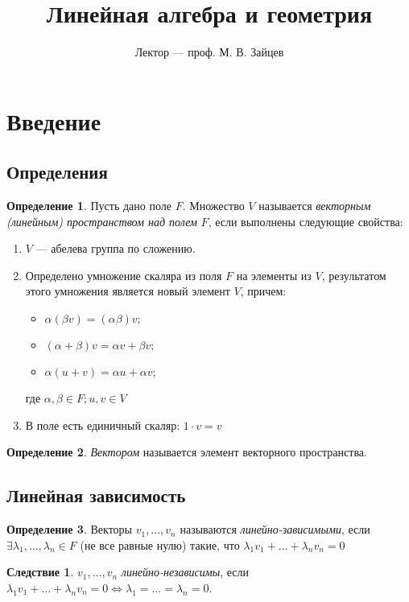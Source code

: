 \documentclass[a4paper]{article}
\title{\textbf{Линейная алгебра и геометрия}}
\author{Лектор --- проф. М. В. Зайцев}
\date{}
\theoremstyle{definition}
\newtheorem{corollary}{Следствие}
\newtheorem{definition}{Определение}
\begin{document}
	\maketitle
	\section{Введение}
	\subsection{Определения}
	\begin{definition}
	Пусть дано поле $F$. Множество $V$ называется \textit{векторным (линейным) пространством над полем} $F$, если выполнены следующие свойства:
	\begin{enumerate}
	\item $V$ --- абелева группа по сложению.
	\item Определено умножение скаляра из поля $F$ на элементы из $V$, результатом этого умножения является новый элемент $V$, причем:
	\begin{itemize}
	\item $\alpha(\beta v) = (\alpha \beta)v;$
	\item $(\alpha + \beta) v = \alpha v + \beta v;$
	\item $\alpha (u + v) = \alpha u + \alpha v;$
	\end{itemize}
	где $\alpha, \beta \in F; u, v \in V$ 
	\item В поле есть единичный скаляр: $1 \cdot v = v$
	\end{enumerate}
	\end{definition}
	\begin{definition}
	\textit{Вектором} называется элемент векторного пространства. 
	\end{definition}

\subsection{Линейная зависимость}

\begin{definition}
	Векторы $v_1, \dots, v_n$ называются \textit{линейно-зависимыми}, если $\exists \lambda_1,\dots,\lambda_n \in F$ (не все равные нулю) такие, что $\lambda_1v_1  + \dots + \lambda_nv_n = 0$
\end{definition}

\begin{corollary}
	$v_1,\dots,v_n$ \textit{линейно-независимы}, если $\lambda_1v_1 + \dots + \lambda_nv_n = 0 \Leftrightarrow \lambda_1 = \dots = \lambda_n = 0$.
\end{corollary}
\end{document}
